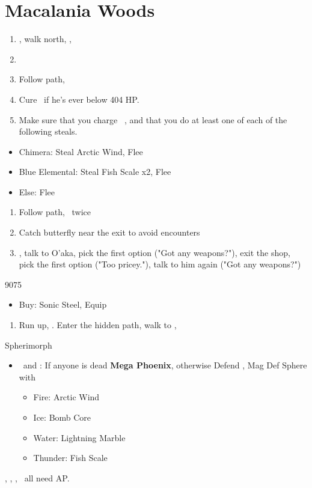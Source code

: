 \chapter{Macalania Woods}

\begin{enumerate}
	\item \sd, walk north, \sd, \save
	\item \formation{\tidus}{\rikku}{\auron}
	\item Follow path, 
	\item Cure \tidus\ if he's ever below 404 HP.
	\item Make sure that you charge \rikku\ \od, and that you do at least one of each of the following steals.
\end{enumerate}
\begin{encounters}
	\begin{itemize}
		\item Chimera: Steal Arctic Wind, Flee
		\item Blue Elemental: Steal Fish Scale x2, Flee
		\item Else: Flee
	\end{itemize}
\end{encounters}
\begin{enumerate}[resume]
	\item Follow path, \sd\ twice
	\item Catch butterfly near the exit to avoid encounters
	\formation{\tidus}{\yuna}{\kimahri}
	\item \save, talk to O'aka, pick the first option ("Got any weapons?"), exit the shop, pick the first option ("Too pricey."), talk to him again ("Got any weapons?")
\end{enumerate}
\begin{shop}{9075}
	\begin{itemize}
		\item Buy: Sonic Steel, Equip
	\end{itemize}
\end{shop}
\begin{enumerate}[resume]
	\item Run up, \sd. Enter the hidden path, walk to \auron, \sd
\end{enumerate}
\bothvfill\winvfill\lossvfill
\begin{battle}[12000]{Spherimorph}
	\begin{itemize}
		\tidusf Change Armor to Yellow Shield
		\tidusf Defend
		\yunaf Defend
		\switch{\tidus}{\rikku}
		\rikkuf Grenade, check the Element
		\item \kimahri\ and \yuna: If anyone is dead \textbf{Mega Phoenix}, otherwise Defend
		\rikkuf \od, Mag Def Sphere with
		\begin{itemize}
			\item Fire: Arctic Wind
			\item Ice: Bomb Core
			\item Water: Lightning Marble
			\item Thunder: Fish Scale
		\end{itemize}
	\end{itemize}
	\tidus, \yuna, \kimahri, \rikku\ all need AP.
\end{battle}
